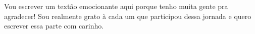 
Vou escrever um textão emocionante aqui porque tenho muita gente pra agradecer! Sou realmente grato à cada um que participou dessa jornada e quero escrever essa parte com carinho.













